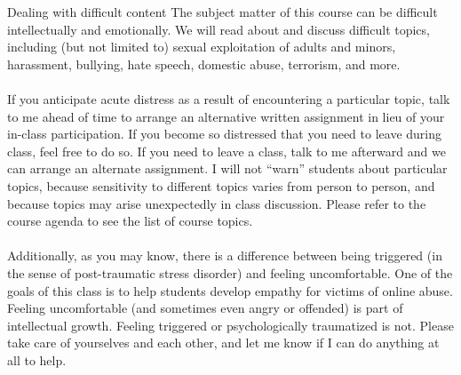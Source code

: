 \documentclass[nobackground,dvipsnames,table]{beamer}
\begin{document}
\begin{frame}{} %
    \thispagestyle{empty}
    \centering
\end{frame}

\begin{frame}{Dealing with difficult content}
    \footnotesize
    The subject matter of this course can be difficult intellectually and emotionally.  We will read about and discuss difficult topics, including (but not limited to) sexual exploitation of adults and minors, harassment, bullying, hate speech, domestic abuse, terrorism, and more.\\~\\
    If you anticipate acute distress as a result of encountering a particular topic, talk to me ahead of time to arrange an alternative written assignment in lieu of your in-class participation. If you become so distressed that you need to leave during class, feel free to do so. If you need to leave a class, talk to me afterward and we can arrange an alternate assignment.  I will not “warn” students about particular topics, because sensitivity to different topics varies from person to person, and because topics may arise unexpectedly in class discussion. Please refer to the course agenda to see the list of course topics.\\~\\
    Additionally, as you may know, there is a difference between being triggered (in the sense of post-traumatic stress disorder) and feeling uncomfortable. One of the goals of this class is to help students develop empathy for victims of online abuse. Feeling uncomfortable (and sometimes even angry or offended) is part of intellectual growth. Feeling triggered or psychologically traumatized is not. Please take care of yourselves and each other, and let me know if I can do anything at all to help.
\end{frame}
\end{document}
